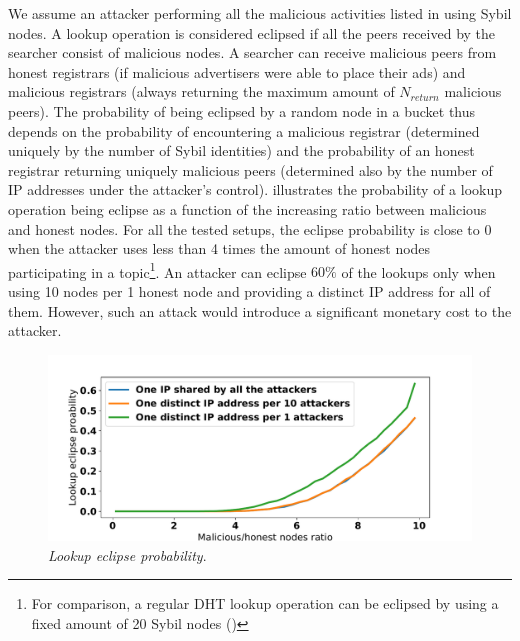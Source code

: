 We assume an attacker performing all the malicious activities listed in  using Sybil nodes. A lookup operation is considered eclipsed if all the peers received by the searcher consist of malicious nodes. A searcher can receive malicious peers from honest registrars (if malicious advertisers were able to place their ads) and malicious registrars (always returning the maximum amount of $N_\textit{return}$ malicious peers). The probability of being eclipsed by a random node in a bucket thus depends on the probability of encountering a malicious registrar (determined uniquely by the number of Sybil identities) and the probability of an honest registrar returning uniquely malicious peers (determined also by the number of IP addresses under the attacker's control).  illustrates the probability of a lookup operation being eclipse as a function of the increasing ratio between malicious and honest nodes. For all the tested setups, the eclipse probability is close to $0$ when the attacker uses less than 4 times the amount of honest nodes participating in a topic\footnote{For comparison, a regular DHT lookup operation can be eclipsed by using a fixed amount of 20 Sybil nodes ()}. An attacker can eclipse $60\%$  of the lookups only when using 10 nodes per 1 honest node and providing a distinct IP address for all of them. However, such an attack would introduce a significant monetary cost to the attacker. 

\begin{figure}[t]
    \includegraphics[width=1\linewidth]{img/eclipse_probability}
    \vspace{-0.1in}
    \caption{\emph{Lookup eclipse probability}.
    }
    \label{fig:eclipse_probability}
    \vspace{-0.1in}
\end{figure}

